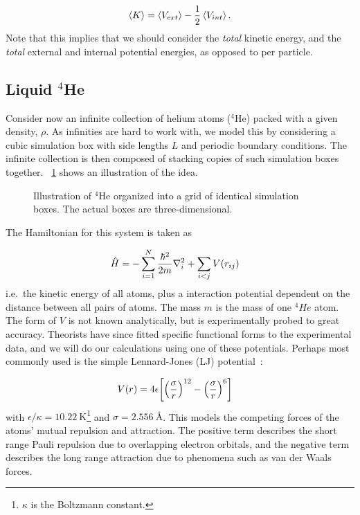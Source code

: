 \documentclass[Thesis.tex]{subfiles}
\begin{document}
\begin{align}
    \expval{K} = \expval{V_{ext}} -
    \frac{1}{2}\expval{V_{int}}.\label{eq:virial-result}
\end{align}
Note that this implies that we should consider the \emph{total} kinetic
energy, and the \emph{total} external and internal potential energies, as opposed to per
particle.


\subsection{Liquid $^4$He}
\label{sec:liquid-helium-theory}

Consider now an infinite collection of helium atoms ($^4$He) packed with a given density,
$\rho$. As infinities are hard to work with, we model this by considering a
cubic simulation box with side lengths $L$ and periodic boundary conditions. The
infinite collection is then composed of stacking copies of such simulation boxes
together. ~\cref{fig:pbc-illustration} shows an illustration of the idea.

\begin{figure}[h]
  \centering
  
  \caption[Illustration of periodic boundary conditions]{Illustration of $^4$He organized into a grid of identical simulation
    boxes. The actual boxes are three-dimensional.}
  \label{fig:pbc-illustration}
\end{figure}


The Hamiltonian for this system is taken as

\begin{align}
    \hat H &= -\sum_{i=1}^N \frac{\hbar^2}{2m}\laplacian_i + \sum_{i < j} V(r_{ij})
\end{align}
i.e.\ the kinetic energy of all atoms, plus a interaction potential dependent on
the distance between all pairs of atoms. The mass $m$ is the mass of one $^4He$
atom. The form of $V$ is not known analytically, but is experimentally probed to
great accuracy. Theorists have since fitted specific functional forms to the
experimental data, and we will do our calculations using one of these
potentials. Perhaps most commonly used is the simple Lennard-Jones (LJ)
potential~\cite{Kalos-1981}:

\begin{align}
    \label{eq:Lennard-Jones-def}
    V(r)
     &= 4\epsilon\qty[\qty( \frac{\sigma}{r} )^{12} - \qty( \frac{\sigma}{r} )^6 ]
\end{align}
with $\epsilon/\kappa = \SI{10.22}{\K}$\footnote{$\kappa$ is the Boltzmann constant.} and $\sigma = \SI{2.556}{\angstrom}$. This
models the competing forces of the atoms' mutual repulsion and attraction. The
positive term describes the short range Pauli repulsion due to overlapping
electron orbitals, and the negative term describes the long range attraction
due to phenomena such as van der Waals forces.
\end{document}
